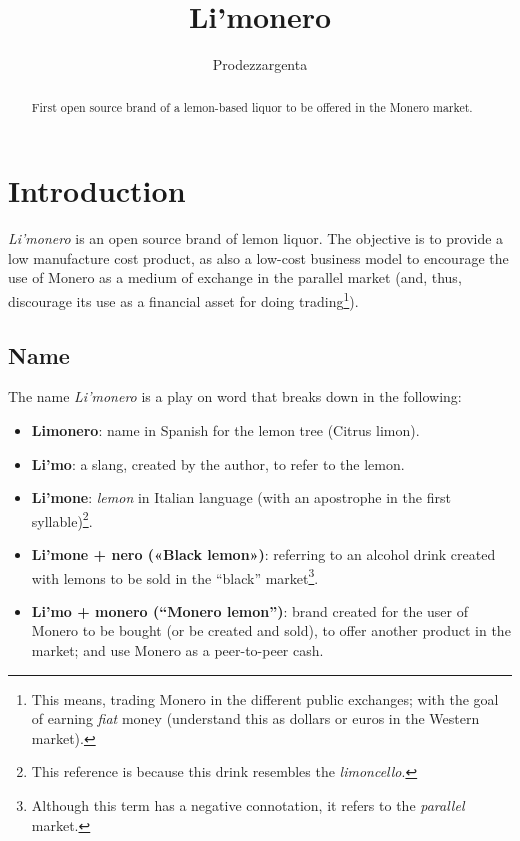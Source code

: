 \documentclass[12pt,a4paper]{article}
\author{Prodezzargenta}
\title{Li'monero}
\begin{document}
\maketitle

\begin{abstract}
First open source brand of a lemon-based liquor to be offered in the Monero market.
\end{abstract}

\tableofcontents

\section{Introduction}
\textit{Li'monero} is an open source brand of lemon liquor. The objective is to provide a low manufacture cost product, as also a low-cost business model to encourage the use of Monero as a medium of exchange in the parallel market (and, thus, discourage its use as a financial asset for doing trading\footnote{This means, trading Monero in the different public exchanges; with the goal of earning \textit{fiat} money (understand this as dollars or euros in the Western market).}).

\subsection{Name}
The name \textit{Li'monero} is a play on word that breaks down in the following:

\begin{itemize}
\item \textbf{Limonero}: name in Spanish for the lemon tree (Citrus limon).
\item \textbf{Li'mo}: a slang, created by the author, to refer to the lemon.
\item \textbf{Li'mone}: \textit{lemon} in Italian language (with an apostrophe in the first syllable)\footnote{This reference is because this drink resembles the \textit{limoncello}.}.
\item \textbf{Li'mone + nero («Black lemon»)}: referring to an alcohol drink created with lemons to be sold in the “black” market\footnote{Although this term has a negative connotation, it refers to the \textit{parallel} market.}.
\item \textbf{Li'mo + monero (“Monero lemon”)}: brand created for the user of Monero to be bought (or be created and sold), to offer another product in the market; and use Monero as a peer-to-peer cash.
\end{itemize}
\end{document}
